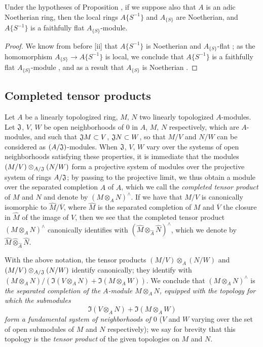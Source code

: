 \begin{cor}[7.6.18]
\label{0.7.6.18}
Under the hypotheses of Proposition , if we suppose also that
$A$ is an adic Noetherian ring, then the local rings $A\{S^{-1}\}$ and $A_{\{S\}}$ are Noetherian,
and $A\{S^{-1}\}$ is a faithfully flat $A_{\{S\}}$-module.
\end{cor}

\begin{proof}
\label{proof-0.7.6.18}
We know from before [ii] that $A\{S^{-1}\}$ is Noetherian and
$A_{\{S\}}$-flat ; as the homomorphism $A_{\{S\}}\to A\{S^{-1}\}$
is local, we conclude that $A\{S^{-1}\}$ is a faithfully flat $A_{\{S\}}$-module
, and as a result that $A_{\{S\}}$ is Noetherian .
\end{proof}

\subsection{Completed tensor products}
\label{subsection-completed-tensor-prods}

\begin{env}[7.7.1]
\label{0.7.1.1}
Let $A$ be a linearly topologized ring, $M$, $N$ two linearly topologized $A$-modules. Let
$\mathfrak{J}$, $V$, $W$ be open neighborhoods of $0$ in $A$, $M$, $N$ respectively, which are
$A$-modules, and such that $\mathfrak{J}M\subset V$, $\mathfrak{J}N\subset W$, so that
$M/V$ and $N/W$ can be considered as $(A/\mathfrak{J})$-modules. When $\mathfrak{J}$, $V$, $W$
vary over the systems of open neighborhoods satisfying these properties, it is immediate that the
modules $(M/V)\otimes_{A/\mathfrak{J}}(N/W)$ form a projective system of modules
over the projective system of rings $A/\mathfrak{J}$; by passing to the projective limit, we
thus obtain a module over the separated completion $\widehat{A}$ of $A$, which we call the
{\em completed tensor product} of $M$ and $N$ and denote by $(M\otimes_A N)^\wedge$. If we have
that $M/V$ is canonically isomorphic to $\widehat{M}/\overline{V}$, where $\widehat{M}$ is the
separated completion of $M$ and $\overline{V}$ the closure in $\widehat{M}$ of the image of $V$,
then we see that the completed tensor product $(M\otimes_A N)^\wedge$ canonically identifies with
$(\widehat{M}\otimes_{\widehat{A}}\widehat{N})^\wedge$, which we denote by
$\widehat{M}\widehat{\otimes}_{\widehat{A}}\widehat{N}$.
\end{env}

\begin{env}[7.7.2]
\label{0.7.7.2}
With the above notation, the tensor products $(M/V)\otimes_A(N/W)$ and
$(M/V)\otimes_{A/\mathfrak{J}}(N/W)$ identify canonically; they identify with
$(M\otimes_A N)/(\Im(V\otimes_A N)+\Im(M\otimes_A W))$. We conclude that $(M\otimes_A N)^\wedge$
is {\em the separated completion of the $A$-module $M\otimes_A N$, equipped with the topology for
which the submodules
\[
  \Im(V\otimes_A N)+\Im(M\otimes_A W)
\]
form a fundamental system of neighborhoods of $0$} ($V$ and $W$ varying over the set of open submodules
of $M$ and $N$ respectively); we say for brevity that this topology is the {\em tensor product} of
the given topologies on $M$ and $N$.
\end{env}


